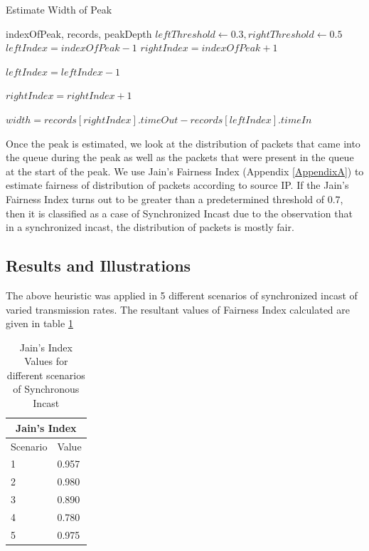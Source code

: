 \begin{algorithm}
	\caption{Estimate Width of Peak}
	\begin{algorithmic}[1]
		\REQUIRE indexOfPeak, records, peakDepth
		\STATE $leftThreshold \leftarrow 0.3, rightThreshold \leftarrow 0.5$
		\STATE $leftIndex = indexOfPeak - 1$
		\STATE $rightIndex = indexOfPeak + 1$
		
		\STATE $leftIndex = leftIndex - 1$
		\ENDWHILE

		\STATE $rightIndex = rightIndex + 1$
		\ENDWHILE

		\STATE $width = records[rightIndex].timeOut - records[leftIndex].timeIn$
	\end{algorithmic}
\end{algorithm}

Once the peak is estimated, we look at the distribution of packets that came into the queue during the peak
as well as the packets that were present in the queue at the start of the peak.
We use Jain's Fairness Index (Appendix \ref{AppendixA}) to estimate fairness of distribution of packets according to source IP.
If the Jain's Fairness Index turns out to be greater than a predetermined threshold of 0.7, then it is classified as a case of 
Synchronized Incast due to the observation that in a synchronized incast, the distribution of packets is mostly fair.
\subsection{Results and Illustrations}
The above heuristic was applied in 5 different scenarios of synchronized incast of varied transmission rates.
The resultant values of Fairness Index calculated are given in table \ref{tab:J_Index_Sync}
\begin{table}[h]
\begin{center}
\begin{tabular}{ |p{3cm}|p{3cm}|  }
	\hline
	\multicolumn{2}{|c|}{Jain's Index} \\
	\hline
	Scenario & Value \\
	\hline
	1 & 0.957 \\
	2 & 0.980 \\
	3 & 0.890 \\
	4 & 0.780 \\
	5 & 0.975 \\
	\hline
   \end{tabular}
\end{center}

\caption{Jain's Index Values for different scenarios of Synchronous Incast}
\label{tab:J_Index_Sync}
\end{table}


